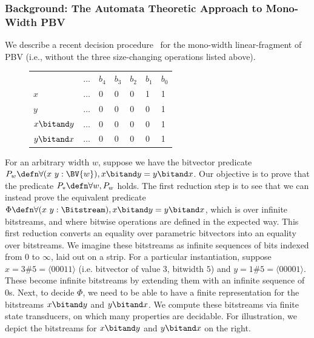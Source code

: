 \subsubsection{Background: The Automata Theoretic Approach to Mono-Width PBV}

We describe a recent decision procedure~\citep{bhat2025certified} for the
mono-width linear-fragment of PBV (i.e., without the three size-changing
operations listed above).

\begin{figure}
{
\vspace{-2em}
\newcommand\SP{1em}
\begin{tabular}{p{0.8cm}|p{\SP}p{\SP}p{\SP}p{\SP}p{\SP}p{\SP}}
  \rowcolor{black!10!white}
          & $\dots$ & $b_4$ & $b_3$ & $b_2$ & $b_1$ & $b_0$ \\
  $x$           & $\dots$ & 0 & 0 & 0 & 1 & 1 \\
  \rowcolor{black!10!white}
  $y$           & $\dots$ & 0 & 0 & 0 & 0 & 1 \\
  \rowcolor{black!5!white}
  $x \bitand y$ & $\dots$ & 0 & 0 & 0 & 0 & 1 \\
  \rowcolor{black!10!white}
  $y \bitand x$ & $\dots$ & 0 & 0 & 0 & 0 & 1 \\
\end{tabular}
}
\end{figure}

For an arbitrary width $w$, suppose we have the bitvector predicate $P_w \defn
\forall (x~y: \BV{w}), x \bitand y = y \bitand x$.
Our objective is to prove that the predicate $P_\ast \defn \forall w, P_w$ holds.
The first reduction step is to see that we can instead prove the equivalent predicate
$\Phi \defn \forall (x~y : \Bitstream), x \bitand y = y \bitand x$, which is
over infinite bitstreams, and where bitwise operations are defined in the
expected way.
%
This first reduction converts an equality over parametric bitvectors into an equality over bitstreams.
%
We imagine these bitstreams as infinite sequences of bits indexed from $0$ to $\infty$,
laid out on a strip. For a particular instantiation, suppose $x = 3\#5 = \langle 00011\rangle$
(i.e. bitvector of value $3$, bitwidth $5$) and $y = 1\#5 = \langle 00001\rangle$.
These become infinite bitstreams by extending them with an infinite sequence of $0$s.
%
Next, to decide $\Phi$, we need to be able to have a finite representation for
the bitstreams $x \bitand y$ and $y \bitand x$.
%
We compute these bitstreams via finite state transducers, on which many
properties are decidable.
%
For illustration, we depict the bitstreams for $x \bitand y$ and $y \bitand x$
on the right.

